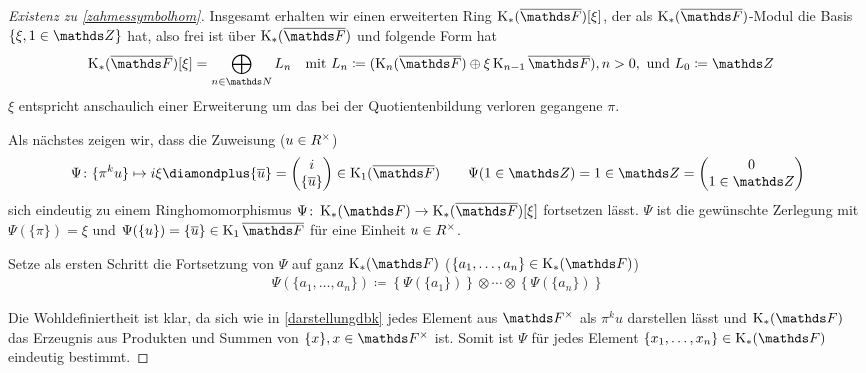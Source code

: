 \documentclass[ngerman,fontsize=11pt, paper=a4, parskip=half, titlepage=true, toc=bib]{scrartcl}
\begin{document}
\begin{proof}[Existenz zu \ref{zahmessymbolhom}]
  Insgesamt erhalten wir einen erweiterten Ring $\KbF[\xi]$, der als
  $\KbF$-Modul die Basis $\{ \xi, 1\in\Z\}$ hat, also frei ist über
  $\KbF$ und folgende Form hat
  \begin{align*}
    \KbF[\xi]&=\bigoplus_{n\in\N}L_n
    &&\text{mit } 
       L_n\coloneqq (\KnbF\oplus\xi\K_{n-1}\bF), n>0,
       \text{ und }L_0\coloneqq\Z
  \end{align*}
  $\xi$ entspricht anschaulich einer Erweiterung um das bei
  der Quotientenbildung verloren gegangene $\pi$.

  Als nächstes zeigen wir, dass die Zuweisung ($u\in R^\times$)
  \begin{gather*}
    \Psi\colon\{\pi^ku\}\mapsto i\xi \p \{\ov u\}
    =\begin{pmatrix} i\\\{\ov u\} \end{pmatrix}\in\K_1(\bF)
    \qquad \Psi(1\in\Z)=1\in\Z=\begin{pmatrix}0\\1\in\Z\end{pmatrix}
  \end{gather*}
  sich eindeutig zu einem Ringhomomorphismus
  $\Psi\colon\KF\to\KbF[\xi]$ fortsetzen lässt.
  $\Psi$ ist die gewünschte Zerlegung mit $\Psi(\{\pi\})=\xi$ 
  und $\Psi(\{u\})=\{\ov u\}\in\K_1\bF$ für
  eine Einheit $u\in R^\times$.

  Setze als ersten Schritt die Fortsetzung von $\Psi$ auf ganz $\KF$
  ($\{a_1,\dotsc,a_n\}\in\KF$)
  \begin{gather*}
    \Psi(\{a_1,\dotsc,a_n\})
    \coloneqq \left\{\Psi(\{a_1\})\right\}\otimes\dotsb
      \otimes \left\{\Psi(\{a_n\})\right\}
  \end{gather*}

  Die Wohldefiniertheit ist klar, da sich wie in \ref{darstellungdbk}
  jedes Element aus $\Fx$ als $\pi^k u$ darstellen lässt und
  $\KF$ das Erzeugnis aus Produkten und Summen von $\{x\}, x\in\Fx$
  ist. Somit ist $\Psi$ für jedes Element $\{x_1,\dotsc,x_n\}\in\KF$ 
  eindeutig bestimmt.


\end{proof}
\end{document}
